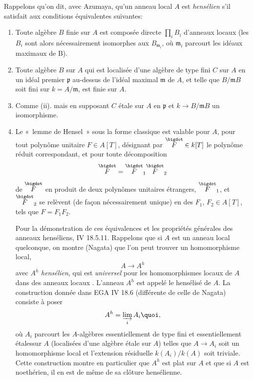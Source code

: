\documentclass[10pt]{../fichiers-configuration-latex/smfart}
\begin{document}
Rappelons qu'on dit, avec Azumaya, qu'un anneau local $A$ est
\emph{hensélien} s'il satisfait aux conditions équivalentes suivantes:
\begin{enumerate}
\renewcommand{\theenumi}{\roman{enumi}}
\renewcommand{\labelenumi}{(\theenumi)}
\item Toute algèbre $B$ finie sur $A$ est composée directe
$\prod_{i} B_i$ d'anneaux locaux (les $B_i$ sont alors
nécessairement isomorphes aux $B_{\mathfrak{m}_i}$, où\pageoriginale
$\mathfrak{m}_i$ parcourt les idéaux maximaux de B).

\item  Toute algèbre $B$ sur $A$ qui est localisée d'une algèbre de
  type fini $C$ sur $A$ en un idéal premier $\mathfrak{p}$ au-dessus de
  l'idéal maximal $\mathfrak{m}$ de $A$, et telle que $B /\mathfrak{m}
  B$ soit fini sur $k = A / \mathfrak{m}$, est finie sur $A$.

\item Comme (ii). mais en supposant $C$ étale sur $A$ en $\mathfrak{p}$
  et $k \to B /\mathfrak{m} B$ un isomorphisme.

\item Le « lemme de Hensel » sous la forme classique est valable
  pour $A$, \ie pour tout polynôme unitaire $F \in A [T]$, désignant
  par $\overset{\bigdot}{F} \in k [T]$ le polynôme réduit correspondant,
  et pour toute décomposition
$$
\overset{\bigdot}{F} = \overset{\bigdot}{F}_1 \overset{\bigdot}{F}_2
$$
de $\overset{\bigdot}{F}$ en produit de deux polynômes unitaires
étrangers, $\overset{\bigdot}{F}_1$, et $\overset{\bigdot}{F}_2$ se
relèvent (de façon nécessairement unique) en des $F_1$, $F_2 \in A
[T]$, tels que $F = F_1 F_2$.

Pour la démonstration de ces équivalences et les propriétés générales
des anneaux henséliens, \cf \EGA IV 18.5.11. Rappelons que si $A$ est
un anneau local quelconque, on montre (Nagata) que l'on peut trouver
un homomorphisme local,
$$
A \to A^{h}
$$
avec $A^{h}$ \emph{hensélien}, qui est \emph{universel} pour les
homomorphismes locaux de $A$ dans des anneaux locaux
. L'anneau $A^h$ est appelé le hensélisé de $A$. La
construction donnée dans EGA IV 18.6 (différente de celle de Nagata)
consiste à poser
$$
A^h = \varinjlim_i A_i{\quoi},
$$
où $A_i$ parcourt les $A$-algèbres essentiellement de type fini et
essentiellement étales\pageoriginale sur $A$ (\ie localisées d'une
algèbre étale sur $A$) telles que $A \to A_i$ soit un homomorphisme
local et l'extension résiduelle $k(A_i) / k(A)$ soit triviale. Cette
construction montre en particulier que $A^h$ est plat sur $A$ et que
si $A$ est noethérien, il en est de même de sa clôture
hensélienne.
\end{enumerate}
\end{document}
